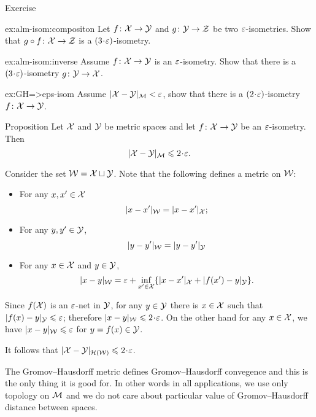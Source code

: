 \begin{thm}{Exercise}\label{ex:alm-isom}

\begin{subthm}{ex:alm-isom:compositon}
Let $f\colon\mathcal{X}\to \mathcal{Y}$ and $g\colon\mathcal{Y}\to \mathcal{Z}$ be two $\varepsilon$-isometries.
Show that $g\circ f\colon \mathcal{X}\to \mathcal{Z}$ is a $(3\cdot\eps)$-isometry.
\end{subthm}

\begin{subthm}{ex:alm-isom:inverse}
Assume $f\: \spc{X} \z\to \spc{Y}$ is an $\varepsilon$-isometry.
Show that there is a $(3\cdot\eps)$-isometry 
$g\colon \mathcal{Y}\to \mathcal{X}$.
\end{subthm}

\begin{subthm}{ex:GH=>eps-isom}
 Assume $|\mathcal{X}-\mathcal{Y}|_{\mathcal{M}}<\varepsilon$, show that there is a $(2\cdot\eps)$-isometry 
$f\colon \mathcal{X}\to \mathcal{Y}$.
\end{subthm}
\end{thm}

\begin{thm}{Proposition}\label{prop:alm-isom=>GH}
Let $\mathcal{X}$ and $\mathcal{Y}$ be metric spaces 
and let $f\colon \mathcal{X}\to \mathcal{Y}$ be an $\varepsilon$-isometry.
Then 
\[|\spc{X}-\spc{Y}|_{\spc{M}}\le 2\cdot \eps.\]
\end{thm}

 Consider the set $\mathcal{W}=\mathcal{X}\sqcup \mathcal{Y}$.
Note that the following defines a metric on $\mathcal{W}$:
\begin{itemize}
\item  For any $x,x'\in \mathcal{X}$
$$|x-x'|_{\mathcal{W}}=|x-x'|_{\mathcal{X}};$$
\item For any $y,y'\in \mathcal{Y}$,
$$|y-y'|_{\mathcal{W}}=|y-y'|_{\mathcal{Y}}$$
\item For any $x\in \mathcal{X}$ and $y\in \mathcal{Y}$,
$$|x-y|_{\mathcal{W}}=\varepsilon+\inf_{x'\in \mathcal{X}}\{|x-x'|_{\mathcal{X}}+|f(x')-y|_{\mathcal{Y}}\}.$$
\end{itemize}

Since $f(\mathcal{X})$ is an $\varepsilon$-net in $\mathcal{Y}$,
for any $y\in \mathcal{Y}$ there is $x\in \mathcal{X}$ such that $|f(x)-y|_{\spc{Y}}\z\le\eps$;
therefore $|x-y|_{\spc{W}}\le 2\cdot\eps$.
On the other hand for any $x\in \mathcal{X}$, we have $|x-y|_{\mathcal{W}}\leqslant\varepsilon$
for $y=f(x)\in \mathcal{Y}$.

It follows that $|\spc{X}-\spc{Y}|_{\mathcal{H}(\spc{W})}\le 2\cdot\eps$.
\qedsf

The Gromov--Hausdorff metric defines Gromov--Hausdorff convegence
and this is the only thing it is good for.
In other words in all applications, we use only topology on $\mathcal{M}$
and we do not care about particular value of Gromov--Hausdorff distance between spaces.

